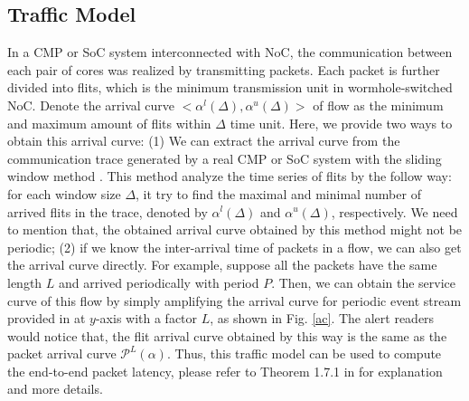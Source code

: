 \documentclass[10pt,journal]{IEEEtran}
\begin{document}
\subsection{Traffic Model}\label{traffic}
In a CMP or SoC system interconnected with NoC, the communication between each pair of cores was realized by transmitting packets. Each packet is further divided into flits, which is the minimum transmission unit in wormhole-switched NoC. Denote the arrival curve $<\alpha^l(\Delta),\alpha^u(\Delta)>$ of flow as the minimum and maximum amount of flits within $\Delta$ time unit. Here, we provide two ways to obtain this arrival curve: (1) We can extract the arrival curve from the communication trace generated by a real CMP or SoC system with the sliding window method \cite{1253607}. This method analyze the time series of flits by the follow way: for each window size $\Delta$, it try to find the maximal and minimal number of arrived flits in the trace, denoted by $\alpha^l(\Delta)$ and $\alpha^u(\Delta)$, respectively. We need to mention that, the obtained arrival curve obtained by this method might not be periodic; (2) if we know the inter-arrival time of packets in a flow, we can also get the arrival curve directly. For example, suppose all the packets have the same length $L$ and arrived periodically with period $P$. Then, we can obtain the service curve of this flow by simply amplifying the arrival curve for periodic event stream provided in \cite{1253607} at $y$-axis with a factor $L$, as shown in Fig. \ref{ac}. The alert readers would notice that, the flit arrival curve obtained by this way is the same as the packet arrival curve $\mathcal{P}^L(\alpha)$. Thus, this traffic model can be used to compute the end-to-end packet latency, please refer to Theorem 1.7.1 in \cite{Boudec2001Network} for explanation and more details.
\end{document}
